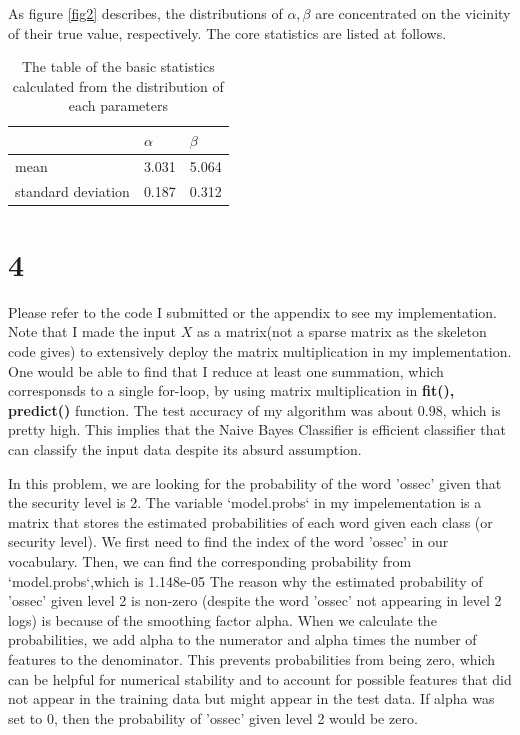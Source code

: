 \documentclass[10pt]{article}
\begin{document}
As figure \ref{fig2} describes, the distributions of $\alpha,\beta$ are concentrated on the vicinity of their true value, respectively. 
The core statistics are listed at follows.
\begin{table}[!h]
    \begin{center}
        \begin{tabular}{lll}
            & $\alpha$ & $\beta$ \\
            \hline \hline
        mean               & 3.031                 & 5.064                \\
        standard deviation & 0.187                 & 0.312               
        \end{tabular}
        \caption{The table of the basic statistics calculated from the distribution of each parameters}
    \end{center}
\end{table}

\section*{4}
Please refer to the code I submitted or the appendix to see my implementation.
Note that I made the input $X$ as a matrix(not a sparse matrix as the skeleton code gives) to extensively deploy the matrix multiplication in my implementation.
One would be able to find that I reduce at least one summation, which corresponsds to a single for-loop, by using matrix multiplication in \textbf{fit(), predict()} function.
The test accuracy of my algorithm was about 0.98, which is pretty high. This implies that the Naive Bayes Classifier is efficient classifier that can classify the input data despite its absurd assumption.


In this problem, we are looking for the probability of the word 'ossec' given that the security level is 2. The variable `model.probs` in my impelementation is a matrix that stores the estimated probabilities of each word given each class (or security level). 
We first need to find the index of the word 'ossec' in our vocabulary. Then, we can find the corresponding probability from `model.probs`,which is 1.148e-05
The reason why the estimated probability of 'ossec' given level 2 is non-zero (despite the word 'ossec' not appearing in level 2 logs) is because of the smoothing factor alpha. 
When we calculate the probabilities, we add alpha to the numerator and alpha times the number of features to the denominator. 
This prevents probabilities from being zero, which can be helpful for numerical stability and to account for possible features that did not appear in the training data but might appear in the test data. 
If alpha was set to 0, then the probability of 'ossec' given level 2 would be zero. 
\end{document}
